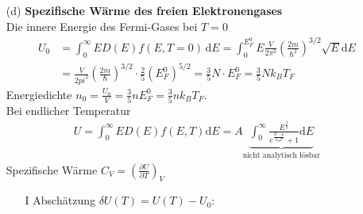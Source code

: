 \begin{itemize}
\item[(d)] \textbf{Spezifische Wärme des freien Elektronengases} \\
        Die innere Energie des Fermi-Gases bei $T=0$
        \begin{align}
            U_0 &= \int_0^\infty E D(E)f(E,T=0) \, \mathrm{d}E = \int_0^{E_F^0} E \frac{V}{2\pi^2} \left( \frac{2m}{\hbar^2} \right)^{3/2} \sqrt{E} \mathrm{d}E\\
            &= \frac{V}{2pi^2} \left(\frac{2m}{\hbar}\right)^{3/2} \cdot \frac{2}{5} (E_F^0)^{5/2} = \frac{3}{5} N \cdot E_F^0 = \frac{3}{5} N k_B T_F
        \end{align}
        Energiedichte $ n_0 = \frac{U_0}{V} = \frac{3}{5} n E_F^0 = \frac{3}{5} n k_B T_F$. \\
        Bei endlicher Temperatur
        \begin{align}
            U = \int_0^\infty E D(E) f(E,T) \mathrm{d}E = A\underbrace{\int_0^\infty \frac{E^{\frac{3}{2}}}{e^{\frac{E-\mu}{k_BT}}+1} \mathrm{d}E}_{\text{nicht analytisch lösbar}}
        \end{align}
        Spezifische Wärme $C_V = \left(\frac{\partial U}{\partial T}\right)_V$ \\
        \begin{itemize}
            \item[I] Abschätzung $\delta U(T) = U(T) - U_0$:
            \item[] {\centering
                
            }



\end{itemize}
\end{itemize}
